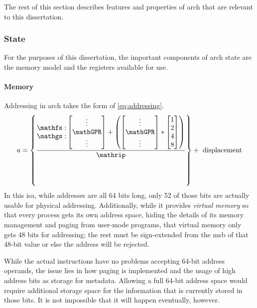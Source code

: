 The rest of this section describes features and properties of \gls{arch} that are relevant
to this dissertation.

\subsubsection{State}
For the purposes of this dissertation,
the important components of \gls{arch} state are the memory model
and the registers available for use.

\paragraph{Memory}
Addressing in \gls{arch} takes the form of \cref{eq:addressing}.
\begin{equation}\label{eq:addressing}
a = \left\{\frac{\begin{matrix}
  \mathfs: \\ \mathgs:
  \end{matrix}\begin{bmatrix}
  \vdots \\ \mathGPR \\ \vdots
  \end{bmatrix}+\left(
  \begin{bmatrix}
  \vdots \\ \mathGPR \\ \vdots
  \end{bmatrix}*\begin{bmatrix}
  1 \\ 2 \\ 4 \\ 8
  \end{bmatrix}
  \right)}{\mathrip}\right\}+\text{ displacement}
\end{equation}
In this \gls{isa}, while addresses are all 64 bits long,
only 52 of those bits are actually usable for physical addressing.
Additionally, while it provides \emph{virtual memory}
so that every process gets its own  address space,
hiding the details of its memory management and paging
from user-mode programs, that virtual memory only gets 48 bits for addressing;
the rest must be sign-extended from the \gls{msb} of that 48-bit value
or else the address will be rejected.

While the actual instructions have no problems accepting 64-bit address operands,
the issue lies in how paging is implemented and the usage of high address bits
as storage for metadata. Allowing a full 64-bit address space would require additional
storage space for the information that is currently stored in those bits.
It is not impossible that it will happen eventually, however.

